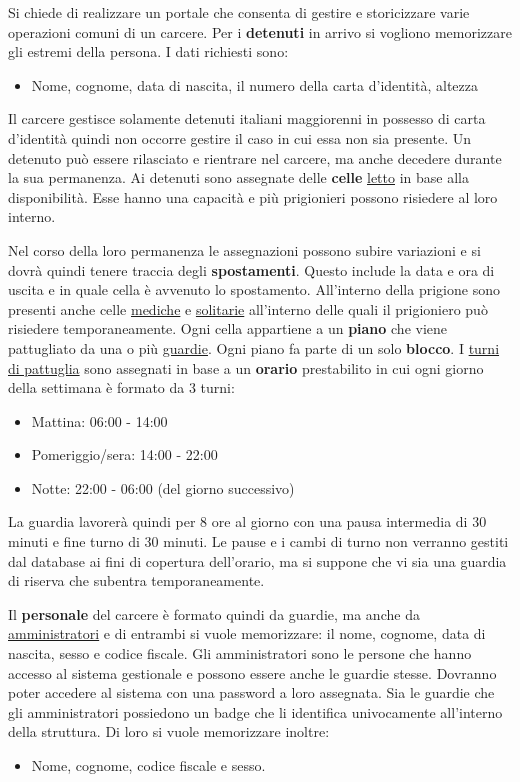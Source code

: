 \documentclass[a4paper,12pt]{report}
\begin{document}
\begin{linenumbers}
\modulolinenumbers[5]
Si chiede di realizzare un portale che consenta di gestire e storicizzare varie operazioni comuni di un carcere. Per i \textbf{detenuti} in arrivo si vogliono memorizzare gli estremi della persona.
%
I dati richiesti sono:
\begin{itemize}
    \item Nome, cognome, data di nascita, il numero della carta d'identità, altezza
\end{itemize}
Il carcere gestisce solamente detenuti italiani maggiorenni in possesso di carta d'identità quindi non occorre gestire il caso in cui essa non sia presente.
%
Un detenuto può essere rilasciato e rientrare nel carcere, ma anche decedere durante la sua permanenza.
%
Ai detenuti sono assegnate delle \textbf{celle} \underline{letto} in base alla disponibilità.
%
Esse hanno una capacità e più prigionieri possono risiedere al loro interno.
%
\par
Nel corso della loro permanenza le assegnazioni possono subire variazioni e si dovrà quindi tenere traccia degli \textbf{spostamenti}.
%
Questo include la data e ora di uscita e in quale cella è avvenuto lo spostamento.
%
All'interno della prigione sono presenti anche celle \underline{mediche} e \underline{solitarie} all'interno delle quali il prigioniero può risiedere temporaneamente.
%
Ogni cella appartiene a un \textbf{piano} che viene pattugliato da una o più \underline{guardie}.
%
Ogni piano fa parte di un solo \textbf{blocco}.
%
I \underline{turni di pattuglia} sono assegnati in base a un \textbf{orario} prestabilito in cui ogni giorno della settimana è formato da 3 turni:
\begin{itemize}
    \item Mattina: 06:00 - 14:00
    \item Pomeriggio/sera: 14:00 - 22:00
    \item Notte: 22:00 - 06:00 (del giorno successivo)
\end{itemize}   
La guardia lavorerà quindi per 8 ore al giorno con una pausa intermedia di 30 minuti e fine turno di 30 minuti.
%
Le pause e i cambi di turno non verranno gestiti dal database ai fini di copertura dell'orario, ma si suppone che vi sia una guardia di riserva che subentra temporaneamente.
%
\par Il \textbf{personale} del carcere è formato quindi da guardie, ma anche da \underline{amministratori} e di entrambi si vuole memorizzare: il nome, cognome, data di nascita, sesso e codice fiscale.
%
Gli amministratori sono le persone che hanno accesso al sistema gestionale e possono essere anche le guardie stesse.
%
Dovranno poter accedere al sistema con una password a loro assegnata.
%
Sia le guardie che gli amministratori possiedono un badge che li identifica univocamente all'interno della struttura.
%
Di loro si vuole memorizzare inoltre:
\begin{itemize}
    \item Nome, cognome, codice fiscale e sesso.
\end{itemize}
\end{linenumbers}
\end{document}
